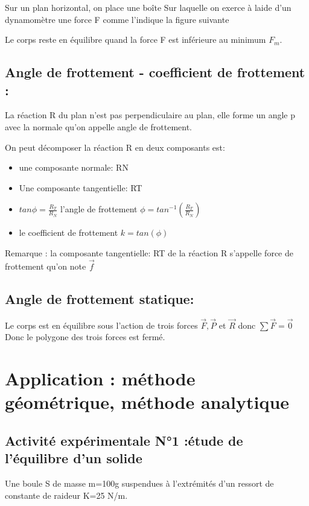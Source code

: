 \documentclass[12pt]{article}
\begin{document}
Sur un plan horizontal, on place une boîte Sur laquelle on exerce à laide d'un dynamomètre une force F comme l'indique la figure suivante

Le corps reste en équilibre quand la force F est inférieure au minimum $F_m$.
\subsection{Angle de frottement - coefficient de frottement :}
La réaction R du plan n'est pas perpendiculaire au plan, elle forme un angle p avec la normale qu'on appelle angle de frottement.

On peut décomposer la réaction R en deux composants est:

\begin{itemize}
\item une composante normale: RN
\item Une composante tangentielle: RT
\item  $tan\phi = \frac{R_T}{R_N}$ l'angle de frottement $\phi = tan^{-1}(\frac{R_T}{R_N})$
\item le coefficient de frottement $k = tan(\phi)$
\end{itemize}
Remarque : la composante tangentielle: RT de la réaction R s'appelle force de frottement qu'on note $\vec{f}$

\subsection{Angle de frottement statique:} 

Le corps est en équilibre sous l'action de trois forces $\vec{F},\vec{P}$ et $\vec{R}$ donc $\sum \vec{F} = \vec{0}$ Donc le polygone des trois forces est fermé.





\section{Application : méthode géométrique, méthode analytique }


\subsection{Activité expérimentale N°1 :étude de l’équilibre d’un solide   }
Une boule S de masse m=100g suspendues à l'extrémités d'un ressort de constante de raideur K=25 N/m.
\end{document}
